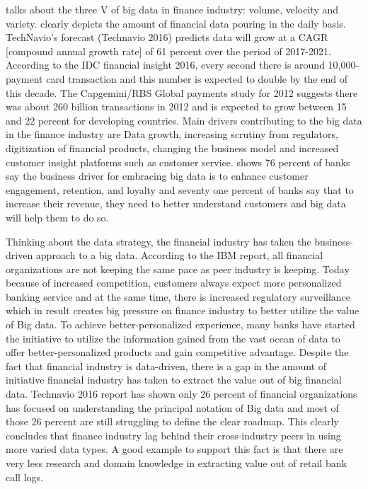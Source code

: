 \indent

\cite{Ref2}  talks about the three V of big data in finance industry: volume, velocity and variety. 
\cite{Ref3} clearly depicts the amount of financial data pouring in the daily basis. 
TechNavio’s forecast (Technavio 2016) predicts data will grow at a CAGR [compound annual growth rate] of 61 percent over the period of 2017-2021.
 According to the IDC financial insight 2016, every second there is around 10,000-payment card transaction and this number is expected to double by the end
 of this decade. The Capgemini/RBS Global payments study for 2012 suggests there was about 260 billion transactions in 2012 and is expected to grow between 15
 and 22 percent for developing countries. Main drivers contributing to the big data in the finance industry are Data growth, increasing scrutiny from regulators,
 digitization of financial products, changing the business model and increased customer insight platforms such as customer service. 
 \cite{Ref2} shows 76 percent of banks say the business driver for embracing big data is to enhance customer engagement, retention, and loyalty and seventy one percent
 of banks say that to increase their revenue, they need to better understand customers and big data will help them to do so. 

\indent

Thinking about the data strategy, the financial industry has taken the business-driven approach to a big data. According to the IBM report, all financial 
organizations are not keeping the same pace as peer industry is keeping. Today because of increased competition, customers always expect more personalized 
banking service and at the same time, there is increased regulatory surveillance which in result creates big pressure on finance industry to better utilize
 the value of Big data. To achieve better-personalized experience, many banks have started the initiative to utilize the information gained from the vast
 ocean of data to offer better-personalized products and gain competitive advantage.  Despite the fact that financial industry is data-driven,
 there is a gap in the amount of initiative financial industry has taken to extract the value out of big financial data.
 Technavio 2016 report has shown only 26 percent of financial organizations has focused on understanding the principal notation of Big data and most 
 of those 26 percent are still struggling to define the clear roadmap. This clearly concludes that finance industry lag behind their cross-industry peers 
 in using more varied data types. A good example to support this fact is that there are very less research and domain knowledge in extracting value out of 
 retail bank call logs.  

